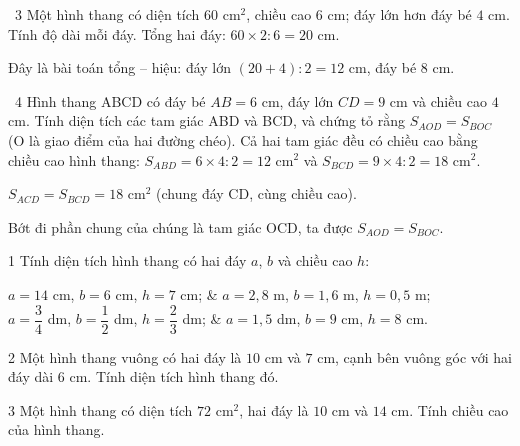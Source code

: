 \gap
\begin{exbox}{\ExWord\ 3}
Một hình thang có diện tích $60$ cm$^2$, chiều cao $6$ cm; đáy lớn hơn đáy bé $4$ cm. Tính độ dài mỗi đáy.
\guide
Tổng hai đáy: $60\times2:6=20$ cm.\par Đây là bài toán tổng -- hiệu: đáy lớn $(20+4):2=12$ cm, đáy bé $8$ cm.
\end{exbox}
\gap
\begin{exbox}{\ExWord\ 4}
Hình thang ABCD có đáy bé $AB=6$ cm, đáy lớn $CD=9$ cm và chiều cao $4$ cm. Tính diện tích các tam giác ABD và BCD, và chứng tỏ rằng $S_{AOD}=S_{BOC}$ (O là giao điểm của hai đường chéo).
\guide
Cả hai tam giác đều có chiều cao bằng chiều cao hình thang: $S_{ABD}=6\times4:2=12$ cm$^2$ và $S_{BCD}=9\times4:2=18$ cm$^2$.\par
$S_{ACD}=S_{BCD}=18$ cm$^2$ (chung đáy CD, cùng chiều cao).\par Bớt đi phần chung của chúng là tam giác OCD, ta được $S_{AOD}=S_{BOC}$.
\end{exbox}
\begin{probbox}{1}{\relax}
Tính diện tích hình thang có hai đáy $a$, $b$ và chiều cao $h$:
\begin{cols2}
 $a=14$ cm, $b=6$ cm, $h=7$ cm; &  $a=2{,}8$ m, $b=1{,}6$ m, $h=0{,}5$ m;\\
 $a=\dfrac34$ dm, $b=\dfrac12$ dm, $h=\dfrac23$ dm; &  $a=1{,}5$ dm, $b=9$ cm, $h=8$ cm.
\end{cols2}
\end{probbox}
\gap
\begin{probbox}{2}{\relax}
Một hình thang vuông có hai đáy là $10$ cm và $7$ cm, cạnh bên vuông góc với hai đáy dài $6$ cm. Tính diện tích hình thang đó.
\end{probbox}
\gap
\begin{probbox}{3}{\relax}
Một hình thang có diện tích $72$ cm$^2$, hai đáy là $10$ cm và $14$ cm. Tính chiều cao của hình thang.
\end{probbox}
